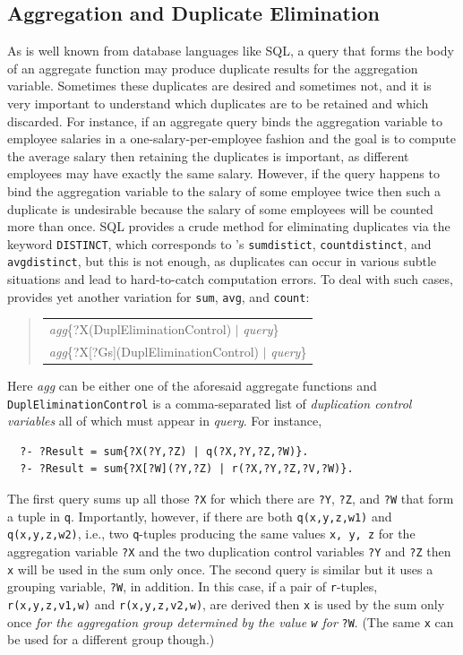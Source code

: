 \documentclass[11pt]{article}
\newcommand{\ERGO}{\mbox{\smaller{\ensuremath{\cal{E}}\smaller{{\sc{RGO}}}}}\xspace}
\newcommand{\FLSYSTEM}{\ERGO}
\newenvironment{qrules}{\begin{quote}\tt\begin{tabular}[t]{l}}%
{\end{tabular}\end{quote}}
\begin{document}
\subsection {Aggregation and Duplicate Elimination}\label{sec-dupl-control}

As is well known from database languages like SQL, a query
that forms the body of an aggregate function
may produce duplicate results for the aggregation variable.
Sometimes these duplicates are desired and sometimes not, and it is very
important to understand which duplicates are to be retained and which
discarded. For instance, if an aggregate query binds the aggregation
variable to employee salaries in a one-salary-per-employee fashion and the
goal is to compute the average salary then
retaining the duplicates is important, as different employees may have
exactly the same salary. However, if the query happens to bind the
aggregation variable to the salary of some employee twice then such a
duplicate is undesirable because the salary of some employees will be
counted more than once.  SQL provides a crude method for eliminating
duplicates via the keyword \texttt{DISTINCT}, which corresponds to
\FLSYSTEM's \texttt{sumdistict}, \texttt{countdistinct}, and
\texttt{avgdistinct}, but this is not enough, as duplicates can occur in
various subtle situations and lead to hard-to-catch computation errors.    
To deal with such cases, \FLSYSTEM provides yet another variation for
\texttt{sum}, \texttt{avg}, and \texttt{count}:
\begin{qrules}
\textnormal{\emph{agg}}\{?X(DuplEliminationControl) $|$ {\it query}\}\\
\textnormal{\emph{agg}}\{?X[?Gs](DuplEliminationControl) $|$ {\it query}\}
\end{qrules}
Here \emph{agg} can be either one of the aforesaid aggregate functions and
\texttt{DuplEliminationControl} is a comma-separated list of \emph{duplication
control variables}   all
of which must appear in \emph{query}. For instance,
\begin{verbatim}
  ?- ?Result = sum{?X(?Y,?Z) | q(?X,?Y,?Z,?W)}.
  ?- ?Result = sum{?X[?W](?Y,?Z) | r(?X,?Y,?Z,?V,?W)}.
\end{verbatim}
The first query sums up all those \texttt{?X} for which there are
\texttt{?Y}, \texttt{?Z}, and \texttt{?W} that form a tuple in \texttt{q}.
Importantly, however, if there are both \texttt{q(x,y,z,w1)} and
\texttt{q(x,y,z,w2)}, i.e., two \texttt{q}-tuples producing the same values
\texttt{x, y, z} for the aggregation variable \texttt{?X} and the two
duplication control variables \texttt{?Y} and \texttt{?Z} then \texttt{x}
will be used in the sum only once.    
The second query is similar but it uses a grouping variable, \texttt{?W},
in addition. 
In this case, if a pair of \texttt{r}-tuples, \texttt{r(x,y,z,v1,w)} and
\texttt{r(x,y,z,v2,w)}, are derived then \texttt{x} is used by the sum only
once \emph{for the aggregation group determined by the value \texttt{w}
  for}
\texttt{?W}.  (The same \texttt{x} can be used for a different group
though.)  
\end{document}

